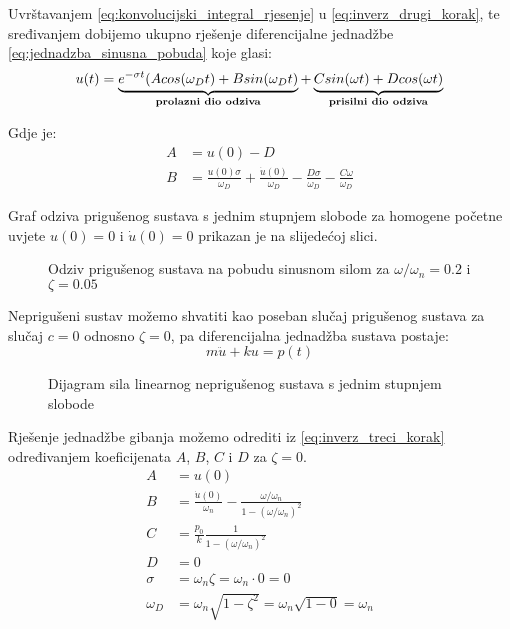 Uvrštavanjem \eqref{eq:konvolucijski_integral_rjesenje} u
\eqref{eq:inverz_drugi_korak}, te sređivanjem dobijemo ukupno rješenje
diferencijalne jednadžbe \eqref{eq:jednadzba_sinusna_pobuda} koje glasi:
\begin{equation}\label{eq:inverz_treci_korak}
	u(t)=\underbrace{
		e^{-\sigma t}(Acos(\omega_D t)+Bsin(\omega_Dt)
		}_{\text{\textbf{prolazni dio odziva}}}
		+
	     \underbrace{
		Csin(\omega t) + Dcos(\omega t)
		     }_{\text{\textbf{prisilni dio odziva}}}
\end{equation}
\newpage

Gdje je:
\begin{align}
    A &= u(0)-D\label{eq:koef_A}\\
    B &= \frac{u(0)\sigma}{\omega_D}+
         \frac{\dot{u}(0)}{\omega_D}-
         \frac{D\sigma}{\omega_D}-
         \frac{C\omega}{\omega_D}\label{eq:koef_B}
\end{align}

Graf odziva prigušenog sustava s jednim stupnjem slobode za homogene početne
uvjete $u(0)=0$ i $\dot{u}(0)=0$ prikazan je na slijedećoj slici.
\begin{figure}[H]
    
    \label{fig:odziv-priguseno}
    \caption{Odziv prigušenog sustava na pobudu sinusnom silom za
    $\omega/\omega_n=0.2$ i $\zeta=0.05$}
\end{figure}

Neprigušeni sustav možemo shvatiti kao poseban slučaj prigušenog sustava za slučaj
$c=0$ odnosno $\zeta=0$, pa diferencijalna jednadžba sustava postaje:
\begin{equation}\label{eq:jednadzba_gibanja_nepriguseni_nesredjeno}
	m\ddot{u}+ku=p(t)
\end{equation}
\begin{figure}[H]
    
    \label{sile-nepriguseni-ekvivalentni-sustav-sdf}
    \caption{Dijagram sila linearnog neprigušenog sustava s jednim stupnjem slobode}
\end{figure}

Rješenje jednadžbe gibanja možemo odrediti iz \eqref{eq:inverz_treci_korak}
određivanjem koeficijenata $A$, $B$, $C$ i $D$ za $\zeta = 0$.
\begin{align}
    A &= u(0) \label{eq:np_koef_A}\\
    B &= \frac{\dot{u}(0)}{\omega_n}-\frac{\omega/\omega_n}{1-(\omega/\omega_n)^2}\label{eq:np_koef_B}\\
    C &= \frac{p_0}{k}\frac{1}{1-(\omega/\omega_n)^2}\label{eq:np_koef_C}\\
    D &= 0\label{eq:np_koef_D}\\
    \sigma &= \omega_n\zeta=\omega_n\cdot 0=0\label{eq:np_sigma}\\
    \omega_D &= \omega_n\sqrt{1-\zeta^2}=\omega_n\sqrt{1-0}=\omega_n\label{eq:np_omega_D}
\end{align}

